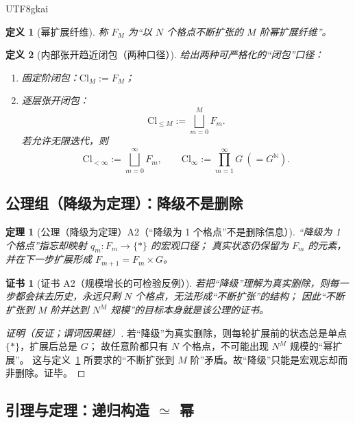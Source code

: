 \documentclass[12pt]{article}
\newtheorem{definition}{定义}[section]
\newtheorem{theorem}{定理}[section]
\newtheorem{Certificate}{证书}[section]
\newcommand{\NN}{\mathbb{N}}
\begin{document}
\begin{CJK*}{UTF8}{gkai}
\begin{definition}[幂扩展纤维]
\label{def:tex27-ch2-power-fiber}
称 $F_M$ 为“以 $N$ 个格点不断扩张的 $M$ 阶幂扩展纤维”。
\end{definition}

\begin{definition}[内部张开趋近闭包（两种口径）]
\label{def:tex27-ch2-closure}
给出两种可严格化的“闭包”口径：
\begin{enumerate}
  \item 固定阶闭包：$\mathrm{Cl}_M:=F_M$；
  \item 逐层张开闭包：
  \[
    \mathrm{Cl}_{\le M}:=\bigsqcup_{m=0}^{M}F_m.
  \]
  若允许无限迭代，则
  \[
    \mathrm{Cl}_{<\infty}:=\bigsqcup_{m=0}^{\infty}F_m,
    \qquad
    \mathrm{Cl}_{\infty}:=\prod_{m=1}^{\infty}G\ (=G^{\NN}).
  \]
\end{enumerate}
\end{definition}

\subsection{公理组（降级为定理）：降级不是删除}
\label{subsec:tex27-ch2-axiom}

\begin{theorem}[公理（降级为定理）A2（“降级为 1 个格点”不是删除信息）]
\label{thm:tex27-ch2-a2}
“降级为 1 个格点”指忘却映射 $q_m:F_m\to\{\ast\}$ 的宏观口径；
真实状态仍保留为 $F_m$ 的元素，并在下一步扩展形成 $F_{m+1}=F_m\times G$。
\end{theorem}

\begin{Certificate}[证书 A2（规模增长的可检验反例）]
\label{cert:tex27-ch2-a2}
若把“降级”理解为真实删除，则每一步都会抹去历史，永远只剩 $N$ 个格点，无法形成“不断扩张”的结构；
因此“不断扩张到 $M$ 阶并达到 $N^M$ 规模”的目标本身就是该公理的证书。
\end{Certificate}

\begin{proof}[证明（反证；谓词因果链）]
若“降级”为真实删除，则每轮扩展前的状态总是单点 $\{\ast\}$，扩展后总是 $G$；
故任意阶都只有 $N$ 个格点，不可能出现 $N^M$ 规模的“幂扩展”。
这与定义~\ref{def:tex27-ch2-power-fiber} 所要求的“不断扩张到 $M$ 阶”矛盾。故“降级”只能是宏观忘却而非删除。证毕。
\end{proof}

\subsection{引理与定理：递归构造 \texorpdfstring{$\simeq$}{≃} 幂}
\label{subsec:tex27-ch2-lem-thm}


\end{CJK*}
\end{document}
